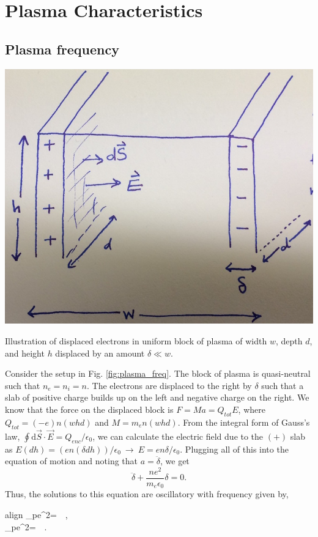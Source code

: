 %
\section{Plasma Characteristics}

	\subsection{Plasma frequency}
	\begin{marginfigure}
		\centering
		\includegraphics[width=\columnwidth]{figures/plasma_frequency.jpeg}
		\caption{Illustration of displaced electrons in uniform block of plasma of width $w$, depth $d$, and height $h$ displaced by an amount $\delta\ll w$.}
		\label{fig:plasma_freq}
	\end{marginfigure}
	Consider the setup in Fig. \ref{fig:plasma_freq}. The block of plasma is quasi-neutral such that $n_e=n_i=n$. The electrons are displaced to the right by $\delta$ such that a slab of positive charge builds up on the left and negative charge on the right. We know that the force on the displaced block is $F=Ma=Q_{tot}E$, where $Q_{tot}=(-e)n(whd)$ and $M=m_en(whd)$. From the integral form of Gauss's law, $\oint\mathrm{d}\vec{S}\cdot\vec{E}=Q_{enc}/\epsilon_0$, we can calculate the electric field due to the $(+)$ slab as $E(dh)=(en(\delta dh))/\epsilon_0~\rightarrow~E=en\delta/\epsilon_0$. Plugging all of this into the equation of motion and noting that $a=\ddot{\delta}$, we get
	\begin{equation}
		\ddot{\delta} + \frac{ne^2}{m_e\epsilon_0}\delta = 0.
	\end{equation}
	Thus, the solutions to this equation are oscillatory with frequency given by,
	\begin{empheq}[box=\widefbox]{align}
		\omega_{pe}^2=~~,\\
		\omega_{pe}^2=~~.
	\end{empheq}

